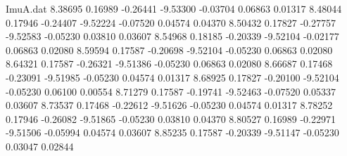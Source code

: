 \begin{filecontents}{ImuA.dat}
   8.38695    0.16989   -0.26441   -9.53300   -0.03704    0.06863    0.01317
   8.48044    0.17946   -0.24407   -9.52224   -0.07520    0.04574    0.04370
   8.50432    0.17827   -0.27757   -9.52583   -0.05230    0.03810    0.03607
   8.54968    0.18185   -0.20339   -9.52104   -0.02177    0.06863    0.02080
   8.59594    0.17587   -0.20698   -9.52104   -0.05230    0.06863    0.02080
   8.64321    0.17587   -0.26321   -9.51386   -0.05230    0.06863    0.02080
   8.66687    0.17468   -0.23091   -9.51985   -0.05230    0.04574    0.01317
   8.68925    0.17827   -0.20100   -9.52104   -0.05230    0.06100    0.00554
   8.71279    0.17587   -0.19741   -9.52463   -0.07520    0.05337    0.03607
   8.73537    0.17468   -0.22612   -9.51626   -0.05230    0.04574    0.01317
   8.78252    0.17946   -0.26082   -9.51865   -0.05230    0.03810    0.04370
   8.80527    0.16989   -0.22971   -9.51506   -0.05994    0.04574    0.03607
   8.85235    0.17587   -0.20339   -9.51147   -0.05230    0.03047    0.02844
\end{filecontents}
